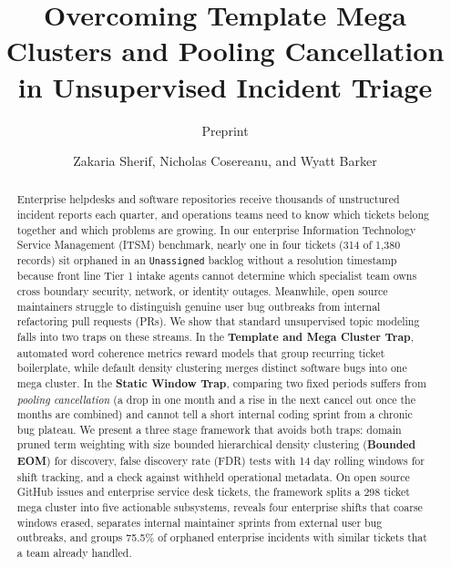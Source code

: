 \documentclass[sigconf,nonacm,pbalance]{acmart}
\begin{document}
\pagestyle{fancy}
\fancyhead{}

\title[Overcoming Template Mega Clusters and Pooling Cancellation]{Overcoming Template Mega Clusters and Pooling Cancellation in Unsupervised Incident Triage}
\subtitle{Preprint}

\author{Zakaria Sherif, Nicholas Cosereanu, and Wyatt Barker}

\renewcommand{\shortauthors}{Sherif, Cosereanu, and Barker}

\begin{abstract}
Enterprise helpdesks and software repositories receive thousands of unstructured incident reports each quarter, and operations teams need to know which tickets belong together and which problems are growing. In our enterprise Information Technology Service Management (ITSM) benchmark, nearly one in four tickets (314 of 1,380 records) sit orphaned in an \texttt{Unassigned} backlog without a resolution timestamp because front line Tier 1 intake agents cannot determine which specialist team owns cross boundary security, network, or identity outages. Meanwhile, open source maintainers struggle to distinguish genuine user bug outbreaks from internal refactoring pull requests (PRs). We show that standard unsupervised topic modeling falls into two traps on these streams. In the \textbf{Template and Mega Cluster Trap}, automated word coherence metrics reward models that group recurring ticket boilerplate, while default density clustering merges distinct software bugs into one mega cluster. In the \textbf{Static Window Trap}, comparing two fixed periods suffers from \emph{pooling cancellation} (a drop in one month and a rise in the next cancel out once the months are combined) and cannot tell a short internal coding sprint from a chronic bug plateau. We present a three stage framework that avoids both traps: domain pruned term weighting with size bounded hierarchical density clustering (\textbf{Bounded EOM}) for discovery, false discovery rate (FDR) tests with 14 day rolling windows for shift tracking, and a check against withheld operational metadata. On open source GitHub issues and enterprise service desk tickets, the framework splits a 298 ticket mega cluster into five actionable subsystems, reveals four enterprise shifts that coarse windows erased, separates internal maintainer sprints from external user bug outbreaks, and groups 75.5\% of orphaned enterprise incidents with similar tickets that a team already handled.
\end{abstract}
\end{document}

